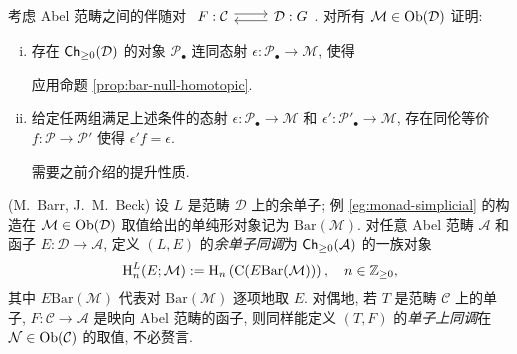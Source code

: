 \begin{Exercises}
	\item 考虑 Abel 范畴之间的伴随对
	$\begin{tikzcd}
		F: \mathcal{C} \arrow[shift left, r] & \mathcal{D}: G \arrow[shift left, l]
	\end{tikzcd}$.
	对所有 $\mathcal{M} \in \operatorname{Ob}(\mathcal{D})$ 证明:
	\begin{enumerate}[(i)]
		\item 存在 $\mathsf{Ch}_{\geq 0}(\mathcal{D})$ 的对象 $\mathcal{P}_\bullet$ 连同态射 $\epsilon: \mathcal{P}_\bullet \to \mathcal{M}$, 使得
		\begin{hint}
			应用命题 \ref{prop:bar-null-homotopic}.
		\end{hint}
		\item 给定任两组满足上述条件的态射 $\epsilon: \mathcal{P}_\bullet \to \mathcal{M}$ 和 $\epsilon': \mathcal{P}'_\bullet \to \mathcal{M}$, 存在同伦等价 $f: \mathcal{P} \to \mathcal{P}'$ 使得 $\epsilon' f = \epsilon$.
		\begin{hint}
			需要之前介绍的提升性质.
		\end{hint}
	\end{enumerate}

	\item (M.\ Barr, J.\ M.\ Beck) 设 $L$ 是范畴 $\mathcal{D}$ 上的余单子; 例 \ref{eg:monad-simplicial} 的构造在 $\mathcal{M} \in \operatorname{Ob}(\mathcal{D})$ 取值给出的单纯形对象记为 $\mathrm{Bar}(\mathcal{M})$. 对任意 Abel 范畴 $\mathcal{A}$ 和函子 $E: \mathcal{D} \to \mathcal{A}$, 定义 $(L, E)$ 的\emph{余单子同调}为 $\mathsf{Ch}_{\geq 0}(\mathcal{A})$ 的一族对象
	\[ \operatorname{H}^L_n(E; \mathcal{M}) := \operatorname{H}_n\left( \mathrm{C}(E\mathrm{Bar}(\mathcal{M})) \right), \quad n \in \mathbb{Z}_{\geq 0}, \]
	其中 $E\mathrm{Bar}(\mathcal{M})$ 代表对 $\mathrm{Bar}(\mathcal{M})$ 逐项地取 $E$. 对偶地, 若 $T$ 是范畴 $\mathcal{C}$ 上的单子, $F: \mathcal{C} \to \mathcal{A}$ 是映向 Abel 范畴的函子, 则同样能定义 $(T, F)$ 的\emph{单子上同调}在 $\mathcal{N} \in \operatorname{Ob}(\mathcal{C})$ 的取值, 不必赘言.


\end{Exercises}
